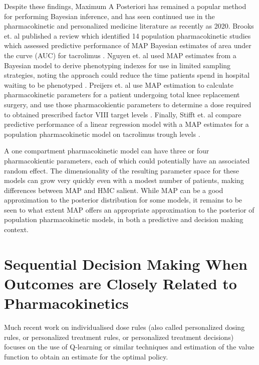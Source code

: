 Despite these findings, Maximum A Posteriori has remained a popular method for performing Bayesian inference, and has seen continued use in the pharmacokinetic and personalized medicine literature as recently as 2020. Brooks et. al \cite{Brooks2016-li} published a review which identified 14 population pharmacokinetic studies which assessed predictive performance of MAP Bayesian estimates of area under the curve (AUC) for tacrolimus  \cite{Brooks2016-li}.  Nguyen et. al used MAP estimates from a Bayesian model to derive phenotyping indexes for use in limited sampling strategies, noting the approach could reduce the time patients spend in hospital waiting to be phenotyped \cite{Nguyen2016-pg}. Preijers et. al use MAP estimation to calculate  pharmacokinetic parameters for a patient undergoing total knee replacement surgery, and use those pharmacokientic parameters to determine a dose required to obtained prescribed factor VIII target levels \cite{Preijers2019-k}.  Finally, Stifft et. al compare predictive performance of a linear regression model with a MAP estimates for a population pharmacokinetic model on tacrolimus trough levels \cite{Stifft2020-uq}.

A one compartment pharmacokinetic model can have three or four pharmacokientic parameters, each of which could potentially have an associated random effect.  The dimensionality of the resulting parameter space for these models can grow very quickly even with a modest number of patients, making differences between MAP and HMC salient.  While MAP can be a good approximation to the posterior distribution for some models, it remains to be seen to what extent MAP offers an appropriate approximation to the posterior of population pharmacokinetic models, in both a predictive and decision making context.


\section{Sequential Decision Making When Outcomes are Closely Related to Pharmacokinetics}


Much recent work on individualised dose rules (also called personalized dosing rules, or personalized treatment rules, or personalized treatment decisions) focuses on the use of Q-learning or similar techniques and estimation of the value function to obtain an estimate for the optimal policy.